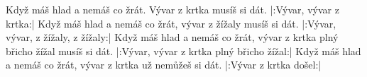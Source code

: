 \ve{}
Když máš hlad
a nemáš co žrát.
Vývar z krtka
musíš si dát.
\cho{}
|:Vývar, vývar z krtka:|
\ve{}
Když máš hlad
a nemáš co žrát,
vývar z žížaly
musíš si dát.
\cho{}
|:Vývar,  vývar, z žížaly, z žížaly:|
\ve{}
Když máš hlad
a nemáš co žrát,
vývar z krtka plný břicho žížal
musíš si dát.
\cho{}
|:Vývar, vývar z krtka plný břicho žížal:|
\ve{}
Když máš hlad
a nemáš co žrát,
vývar z krtka už
nemůžeš si dát.
\cho{}
|:Vývar z krtka došel:|
\esong{}
